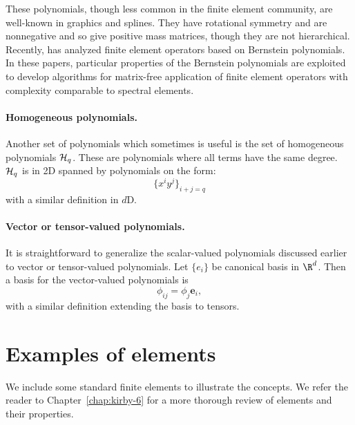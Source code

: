 These polynomials, though less common in the finite element community,
are well-known in graphics and splines.  They have rotational symmetry
and are nonnegative and so give positive mass matrices, though
they are not hierarchical.  Recently, \citet{Kirby2009,Kirby2010}
has analyzed finite element operators based on Bernstein polynomials.
In these papers, particular properties of the Bernstein polynomials are
exploited to develop algorithms for matrix-free application of finite
element operators with complexity comparable to spectral elements.


\paragraph{Homogeneous polynomials.}
\label{sec:homo:pol}
Another set of polynomials which sometimes is useful is the set of
homogeneous polynomials ${\mathcal{H}}_q$. These are polynomials where all terms
have the same degree. ${\mathcal{H}}_q$ is in 2D spanned by polynomials on the form:
\begin{equation}
\{ x^i y^j \}_{i+j=q}
\end{equation}
with a similar definition in $d$D.

\paragraph{Vector or tensor-valued polynomials.}
It is straightforward to generalize the scalar-valued polynomials
discussed earlier to vector or tensor-valued polynomials. Let $\{e_i\}$
be canonical basis in $\R^d$. Then a basis for the vector-valued
polynomials is
\begin{equation}
\phi_{ij} = \phi_j \mathbf{e}_i,
\end{equation}
with a similar definition extending the basis to tensors.


\section{Examples of elements}

We include some standard finite elements to illustrate the concepts.
We refer the reader to Chapter~\ref{chap:kirby-6} for a more thorough
review of elements and their properties.


